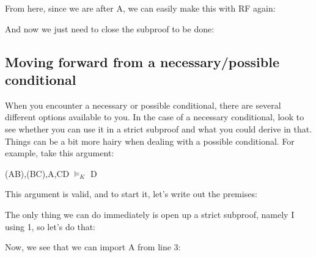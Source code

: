 From here, since we are after \ediamond A, we can easily make this with RF again:

\begin{fitchproof}
\open
{}
\end{fitchproof}

And now we just need to close the subproof to be done:

\begin{fitchproof}
\open
{}
\close
{}		
\end{fitchproof}

\subsection{Moving forward from a necessary/possible conditional}

When you encounter a necessary or possible conditional, there are several different options available to you. In the case of a necessary conditional, look to see whether you can use it in a strict subproof and what you could derive in that. Things can be a bit more hairy when dealing with a possible conditional. For example, take this argument: 
\begin{center}
\ediamond (A\eif B),\ebox (B\eif C),\ebox A,\ediamond C\eif D $\vDash_K$ D
\end{center}
This argument is valid, and to start it, let's write out the premises: 
\begin{fitchproof}
\end{fitchproof}
The only thing we can do immediately is open up a strict subproof, namely \ediamond I using 1, so let's do that:
\begin{fitchproof}
\open
{} 
\end{fitchproof}

Now, we see that we can import A from line 3:

\begin{fitchproof}
\open
{} 
\end{fitchproof}

